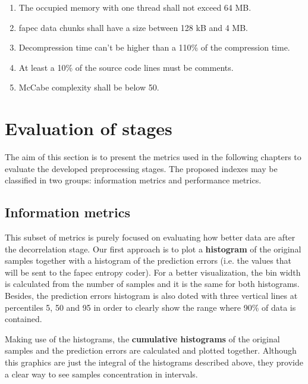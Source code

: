 \begin{enumerate}
	\item The occupied memory with one thread shall not exceed 64 MB.
	\item \acrshort{fapec} data chunks shall have a size between 128 kB and 4 MB.
	\item Decompression time can't be higher than a 110\% of the compression time.
	\item At least a 10\% of the source code lines must be comments.
	\item McCabe complexity \parencite{mccabe} shall be below 50.
\end{enumerate}

\section{Evaluation of stages}
The aim of this section is to present the metrics used in the following chapters to evaluate the developed preprocessing stages. The proposed indexes may be classified in two groups: information metrics and performance metrics.

\subsection{Information metrics}
This subset of metrics is purely focused on evaluating how better data are after the decorrelation stage. Our first approach is to plot a \textbf{histogram} of the original samples together with a histogram of the prediction errors (i.e. the values that will be sent to the \acrshort{fapec} entropy coder). For a better visualization, the bin width is calculated from the number of samples and it is the same for both histograms. Besides, the prediction errors histogram is also doted with three vertical lines at percentiles 5, 50 and 95 in order to clearly show the range where 90\% of data is contained.

Making use of the histograms, the \textbf{cumulative histograms} of the original samples and the prediction errors are calculated and plotted together. Although this graphics are just the integral of the histograms described above, they provide a clear way to see samples concentration in intervals.

